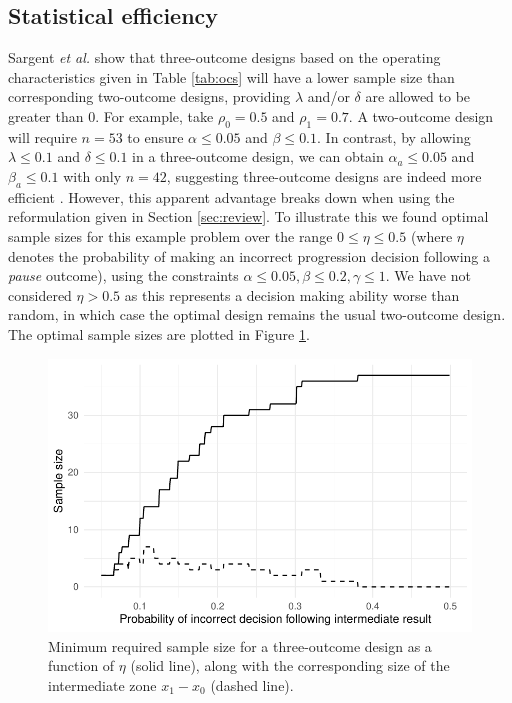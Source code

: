 \documentclass{bmcart}
\begin{document}
\subsection{Statistical efficiency}\label{sec:efficiency}

Sargent \emph{et al.} show that three-outcome designs based on the operating characteristics given in Table \ref{tab:ocs} will have a lower sample size than corresponding two-outcome designs, providing $\lambda$ and/or $\delta$ are allowed to be greater than 0. For example, take $\rho_0 = 0.5$ and $\rho_1 = 0.7$. A two-outcome design will require $n = 53$ to ensure $\alpha \leq 0.05$ and $\beta \leq 0.1$. In contrast, by allowing $\lambda \leq 0.1$ and $\delta \leq 0.1$ in a three-outcome design, we can obtain $\alpha_a \leq 0.05$ and $\beta_a \leq 0.1$ with only $n = 42$, suggesting three-outcome designs are indeed more efficient \cite{Sargent2001, Hong2007}. However, this apparent advantage breaks down when using the reformulation given in Section \ref{sec:review}. To illustrate this we found optimal sample sizes for this example problem over the range $0 \leq \eta \leq 0.5$ (where $\eta$ denotes the probability of making an incorrect progression decision following a \emph{pause} outcome), using the constraints $\alpha \leq 0.05, \beta \leq 0.2, \gamma \leq 1$. We have not considered $\eta > 0.5$ as this represents a decision making ability worse than random, in which case the optimal design remains the usual two-outcome design. The optimal sample sizes are plotted in Figure \ref{fig:eta_ns}.

\begin{figure}
\centering
\includegraphics[scale=0.8]{./figures/eta_ns}
\caption{Minimum required sample size for a three-outcome design as a function of $\eta$ (solid line), along with the corresponding size of the intermediate zone $x_1 - x_0$ (dashed line).}
\label{fig:eta_ns}
\end{figure}
\end{document}
